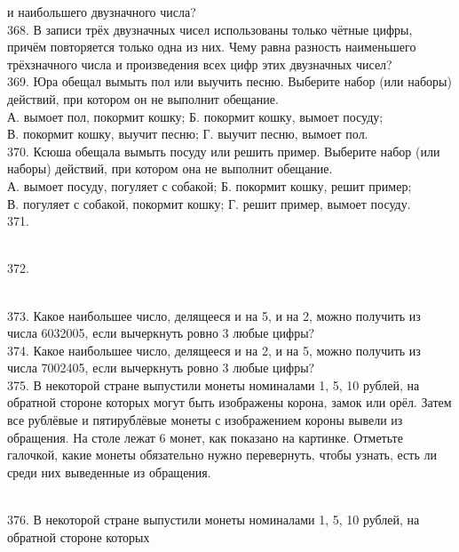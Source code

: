 и наибольшего двузначного числа?\\
368. В записи трёх двузначных чисел использованы только чётные цифры, причём повторяется только одна из них. Чему равна разность наименьшего
трёхзначного числа и произведения всех цифр этих двузначных чисел?\\
369. Юра обещал вымыть пол или выучить песню. Выберите набор (или наборы) действий, при котором он не выполнит обещание.\\
А. вымоет пол, покормит кошку;  \qquad \qquad Б. покормит кошку, вымоет посуду;\\
В. покормит кошку, выучит песню; \qquad \quad Г. выучит песню, вымоет пол.\\
370. Ксюша обещала вымыть посуду или решить пример. Выберите набор (или наборы) действий, при котором она не выполнит обещание.\\
А. вымоет посуду, погуляет с собакой;  \qquad \quad Б. покормит кошку, решит пример;\\
В. погуляет с собакой, покормит кошку; \qquad  Г. решит пример, вымоет посуду.\\
371. \begin{figure}[ht!]
\end{figure}\\
372. \begin{figure}[ht!]
\end{figure}\\
373. Какое наибольшее число, делящееся и на 5, и на 2, можно получить из числа 6032005, если
вычеркнуть ровно 3 любые цифры?\\
374. Какое наибольшее число, делящееся и на 2, и на 5, можно получить из числа 7002405, если
вычеркнуть ровно 3 любые цифры?\\
375. В некоторой стране выпустили монеты номиналами 1, 5, 10 рублей, на обратной стороне которых
могут быть изображены корона, замок или орёл. Затем все рублёвые и пятирублёвые монеты с
изображением короны вывели из обращения. На столе лежат 6 монет, как показано на картинке.
Отметьте галочкой, какие монеты обязательно нужно перевернуть, чтобы узнать, есть ли среди них
выведенные из обращения.\\
\begin{figure}[ht!]
\end{figure}\\
376. В некоторой стране выпустили монеты номиналами 1, 5, 10 рублей, на обратной стороне которых
